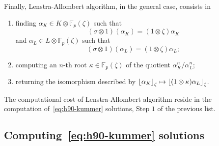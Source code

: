 Finally, Lenstra-Allombert algorithm, in the general case, consists in
\begin{enumerate}
  \item finding $\alpha_K\in K\otimes\mathbb{F}_p(\zeta)$ such that
    \[
      (\sigma\otimes1)(\alpha_K)=(1\otimes\zeta)\alpha_K
    \]
    and $\alpha_L\in L\otimes\mathbb{F}_p(\zeta)$ such that
    \[
      (\sigma\otimes1)(\alpha_L)=(1\otimes\zeta)\alpha_L;
    \]
  \item computing an $n$-th root $\kappa\in\mathbb{F}_p(\zeta)$ of the quotient
    $\alpha_K^n/\alpha_L^n$;
  \item returning the isomorphism described by
    $\left\lfloor \alpha_K \right\rfloor_{\zeta}\mapsto\left\lfloor (1\otimes\kappa)\alpha_L \right\rfloor_{\zeta}$.
\end{enumerate}
The computational cost of Lenstra-Allombert algorithm reside in the computation
of~\eqref{eq:h90-kummer} solutions, \ie Step $1$ of the previous list.

\subsection{Computing~\eqref{eq:h90-kummer} solutions}

